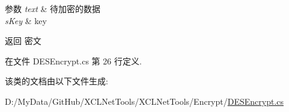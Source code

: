 \begin{DoxyParams}{参数}
{\em text} & 待加密的数据\\
\hline
{\em s\+Key} & key\\
\hline
\end{DoxyParams}
\begin{DoxyReturn}{返回}
密文
\end{DoxyReturn}


在文件 D\+E\+S\+Encrypt.\+cs 第 26 行定义.



该类的文档由以下文件生成\+:\begin{DoxyCompactItemize}
\item 
D\+:/\+My\+Data/\+Git\+Hub/\+X\+C\+L\+Net\+Tools/\+X\+C\+L\+Net\+Tools/\+Encrypt/\hyperlink{_d_e_s_encrypt_8cs}{D\+E\+S\+Encrypt.\+cs}\end{DoxyCompactItemize}
